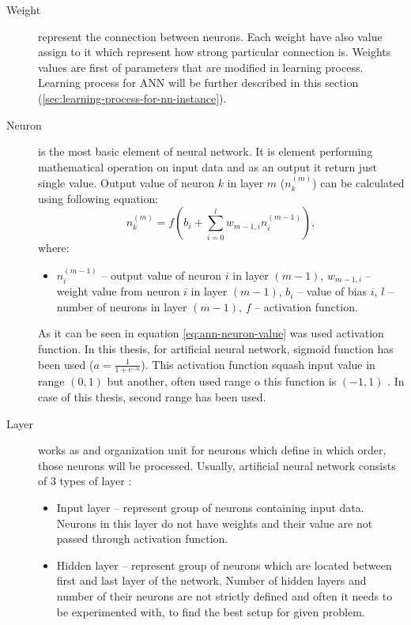     \begin{description}
        \item[Weight] represent the connection between neurons. Each weight have also value assign to it which represent how strong particular connection is. Weights values are first of parameters that are modified in learning process. Learning process for ANN will be further described in this section (\ref{sec:learning-process-for-nn-instance}).
        \item[Neuron] is the most basic element of neural network. It is element performing mathematical operation on input data and as an output it return just single value. Output value of neuron $k$ in layer $m$ ($n_k^{(m)}$) can be calculated using following equation:
        \begin{equation}\label{eq:ann-neuron-value}
            n_k^{(m)} = f\left(b_i + \sum_{i = 0}^{l} w_{m-1, i} n_i^{(m-1)}\right),
        \end{equation}
        where:
        \begin{itemize}[label=]
            \item $n_i^{(m-1)}$ -- output value of neuron $i$ in layer $(m-1)$, $w_{m-1, i}$ -- weight value from neuron $i$ in layer $(m-1)$, $b_i$ -- value of bias $i$, $l$ -- number of neurons in layer $(m-1)$, $f$ -- activation function.
        \end{itemize}
        As it can be seen in equation \eqref{eq:ann-neuron-value} was used activation function. In this thesis, for artificial neural network, sigmoid function has been used ($a=\frac{1}{1 + e^{-n}}$). This activation function squash input value in range $(0, 1)$ but another, often used range o this function is $(-1, 1)$ \cite{bib:internet-sigmoid-function}. In case of this thesis, second range has been used.
        \item[Layer] works as and organization unit for neurons which define in which order, those neurons will be processed. Usually, artificial neural network consists of 3 types of layer \cite{bib:book-make-own-neural-network}:
        \begin{itemize}
            \item Input layer -- represent group of neurons containing input data. Neurons in this layer do not have weights and their value are not passed through activation function.
            \item Hidden layer -- represent group of neurons which are located between first and last layer of the network. Number of hidden layers and number of their neurons are not strictly defined and often it needs to be experimented with, to find the best setup for given problem.

\end{itemize}
\end{description}
